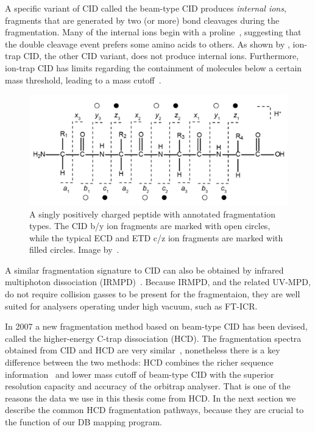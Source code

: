 A specific variant of CID called the beam-type CID produces \emph{internal ions}, fragments that are generated by two (or more) bond cleavages during the fragmentation. Many of the internal ions begin with a proline~\cite{michalski2012systematic}, suggesting that the double cleavage event prefers some amino acids to others. As shown by \citet{michalski2012systematic}, ion-trap CID, the other CID variant, does not produce internal ions. Furthermore, ion-trap CID has limits regarding the containment of molecules below a certain mass threshold, leading to a mass cutoff~\cite{louris1987instrumentation}.

\begin{figure}
  \centering
  \includegraphics[width=.75\linewidth]{img/fragment-types.png}
  \caption{A singly positively charged peptide with annotated fragmentation types. The CID b/y ion fragments are marked with open circles, while the typical ECD and ETD c/z ion fragments are marked with filled circles. Image by~\citet{hart2014review}.}\label{fig:fragment-types}
\end{figure}

A similar fragmentation signature to CID can also be obtained by infrared multiphoton dissociation (IRMPD)~\cite{oomens2006gas}. Because IRMPD, and the related UV-MPD, do not require collision gasses to be present for the fragmentaion, they are well suited for analysers operating under high vacuum, such as FT-ICR\@.

In 2007 a new fragmentation method based on beam-type CID has been devised, called the higher-energy C-trap dissociation (HCD)\@. The fragmentation spectra obtained from CID and HCD are very similar~\cite{michalski2012systematic}, nonetheless there is a key difference between the two methods: HCD combines the richer sequence information~\cite{xia2006ion} and lower mass cutoff of beam-type CID with the superior resolution capacity and accuracy of the orbitrap analyser. That is one of the reasons the data we use in this thesis come from HCD\@. In the next section we describe the common HCD fragmentation pathways, because they are crucial to the function of our DB mapping program.

